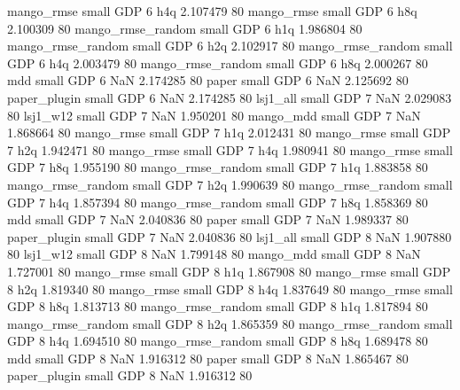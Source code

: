        mango_rmse      small      GDP                 6                  h4q 2.107479 80
       mango_rmse      small      GDP                 6                  h8q 2.100309 80
mango_rmse_random      small      GDP                 6                  h1q 1.986804 80
mango_rmse_random      small      GDP                 6                  h2q 2.102917 80
mango_rmse_random      small      GDP                 6                  h4q 2.003479 80
mango_rmse_random      small      GDP                 6                  h8q 2.000267 80
              mdd      small      GDP                 6                  NaN 2.174285 80
            paper      small      GDP                 6                  NaN 2.125692 80
     paper_plugin      small      GDP                 6                  NaN 2.174285 80
         lsj1_all      small      GDP                 7                  NaN 2.029083 80
         lsj1_w12      small      GDP                 7                  NaN 1.950201 80
        mango_mdd      small      GDP                 7                  NaN 1.868664 80
       mango_rmse      small      GDP                 7                  h1q 2.012431 80
       mango_rmse      small      GDP                 7                  h2q 1.942471 80
       mango_rmse      small      GDP                 7                  h4q 1.980941 80
       mango_rmse      small      GDP                 7                  h8q 1.955190 80
mango_rmse_random      small      GDP                 7                  h1q 1.883858 80
mango_rmse_random      small      GDP                 7                  h2q 1.990639 80
mango_rmse_random      small      GDP                 7                  h4q 1.857394 80
mango_rmse_random      small      GDP                 7                  h8q 1.858369 80
              mdd      small      GDP                 7                  NaN 2.040836 80
            paper      small      GDP                 7                  NaN 1.989337 80
     paper_plugin      small      GDP                 7                  NaN 2.040836 80
         lsj1_all      small      GDP                 8                  NaN 1.907880 80
         lsj1_w12      small      GDP                 8                  NaN 1.799148 80
        mango_mdd      small      GDP                 8                  NaN 1.727001 80
       mango_rmse      small      GDP                 8                  h1q 1.867908 80
       mango_rmse      small      GDP                 8                  h2q 1.819340 80
       mango_rmse      small      GDP                 8                  h4q 1.837649 80
       mango_rmse      small      GDP                 8                  h8q 1.813713 80
mango_rmse_random      small      GDP                 8                  h1q 1.817894 80
mango_rmse_random      small      GDP                 8                  h2q 1.865359 80
mango_rmse_random      small      GDP                 8                  h4q 1.694510 80
mango_rmse_random      small      GDP                 8                  h8q 1.689478 80
              mdd      small      GDP                 8                  NaN 1.916312 80
            paper      small      GDP                 8                  NaN 1.865467 80
     paper_plugin      small      GDP                 8                  NaN 1.916312 80